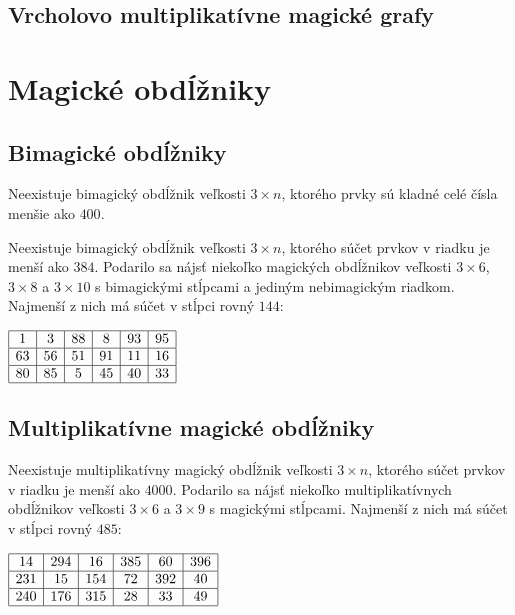 \subsection{Vrcholovo multiplikatívne magické grafy}

\section{Magické obdĺžniky}

\subsection{Bimagické obdĺžniky}

\begin{subresult} Neexistuje bimagický obdĺžnik veľkosti $3 \times n$, ktorého prvky sú kladné celé čísla menšie ako $400$.
\end{subresult} 

\begin{subresult} Neexistuje bimagický obdĺžnik veľkosti $3 \times n$, ktorého súčet prvkov v riadku je menší ako $384$. Podarilo sa nájsť niekoľko magických obdĺžnikov veľkosti $3 \times 6$, $3 \times 8$ a $3 \times 10$ s bimagickými stĺpcami a jediným nebimagickým riadkom. Najmenší z nich má súčet v stĺpci rovný $144$:
\end{subresult}

\begin{center}
$\begin{array}{ |c|c|c|c|c|c| } 
\hline
1 & 3 & 88 & 8 & 93 & 95 \\ 
\hline
63 & 56 & 51 & 91 & 11 & 16 \\ 
\hline
80 & 85 & 5 & 45 & 40 & 33 \\ 
\hline
\end{array}$
\end{center}


\subsection{Multiplikatívne magické obdĺžniky}

\begin{subresult} Neexistuje multiplikatívny magický obdĺžnik veľkosti $3 \times n$, ktorého súčet prvkov v riadku je menší ako $4000$. Podarilo sa nájsť niekoľko multiplikatívnych obdĺžnikov veľkosti $3 \times 6$ a $3 \times 9$ s magickými stĺpcami. Najmenší z nich má súčet v stĺpci rovný $485$:
\end{subresult}

\begin{center}
$\begin{array}{ |c|c|c|c|c|c| } 
\hline
14 & 294 & 16 & 385 & 60 & 396 \\ 
\hline
231 & 15 & 154 & 72 & 392 & 40 \\ 
\hline
240 & 176 & 315 & 28 & 33 & 49 \\ 
\hline
\end{array}$
\end{center}



